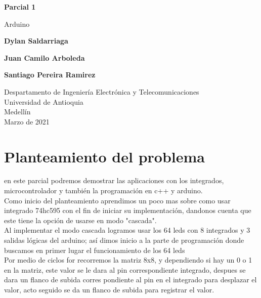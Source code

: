 \documentclass{article}
\begin{document}
\begin{titlepage}
    \begin{center}
        \vspace*{1cm}
            
        \Huge
        \textbf{Parcial 1}
            
        \vspace{0.5cm}
        \LARGE
        Arduino
            
        \vspace{1.5cm}
            
        \textbf{Dylan Saldarriaga}
        
         \textbf{Juan Camilo Arboleda}
         
         \textbf{Santiago Pereira Ramirez}
       
        \vfill
            
        \vspace{0.8cm}
            
        \Large
        Despartamento de Ingeniería Electrónica y Telecomunicaciones\\
        Universidad de Antioquia\\
        Medellín\\
        Marzo de 2021
            
    \end{center}
\end{titlepage}

\tableofcontents
\newpage
\section{Planteamiento del problema}\label{intro}
en este parcial podremos demostrar las aplicaciones con los integrados, microcontrolador y también la programación en c++ y arduino.\\

Como inicio del planteamiento aprendimos un poco mas sobre como usar integrado 74hc595 con el fin de iniciar su implementación, dandonos cuenta que este tiene la opción de usarse en modo "cascada".\\

Al implementar el modo cascada logramos usar los 64 leds con 8 integrados y 3 salidas lógicas del arduino; así dimos inicio a la parte de programación donde buscamos en primer lugar el funcionamiento de los 64 leds\\

Por medio de ciclos for recorremos la matriz 8x8, y dependiendo si hay un 0 o 1 en la matriz, este valor se le dara al pin correspondiente integrado, despues se dara un flanco de subida corres pondiente al pin en el integrado para desplazar el valor, acto seguido se da un flanco de subida para registrar el valor.
\end{document}
